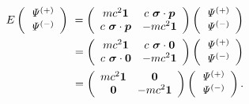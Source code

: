 \documentclass[%
 reprint,
 amsmath,amssymb,
 aps,
]{revtex4-1}
\numberwithin{equation}{section}%
\begin{document}
        
        \begin{align}
            E
            \left( 
                \begin{array}{c}
                    \it\Psi^{(+)} \\ \it\Psi^{(-)}
                \end{array}
            \right) \
            =
            \left(
                \begin{array}{cc}
                    m c^2 \bm{1} 
                        & c \ \bm{\sigma} \cdot \bm{p} \\
                    c \ \bm{\sigma} \cdot \bm{p}
                        & - m c^2 \bm{1} \end{array}
            \right)
            \left(
                \begin{array}{c}
                    \it\Psi^{(+)} \\ \it\Psi^{(-)}
                \end{array}
            \right)
            \notag
            \\
            =
            \left(
                \begin{array}{cc}
                    m c^2 \bm{1} 
                        & c \ \bm{\sigma} \cdot \bm{0} \\
                    c \ \bm{\sigma} \cdot \bm{0}
                        & - m c^2 \bm{1} \end{array}
            \right)
            \left(
                \begin{array}{c}
                    \it\Psi^{(+)} \\ \it\Psi^{(-)}
                \end{array}
            \right)
            \notag
            \\
            =
            \left(
                \begin{array}{cc}
                    m c^2 \bm{1} 
                        & \bm{0} \\
                    \bm{0}
                        & - m c^2 \bm{1} \end{array}
            \right)
            \left(
                \begin{array}{c}
                    \it\Psi^{(+)} \\ \it\Psi^{(-)}
                \end{array}
            \right)
        .
        \label{e_matrix_3}
        \end{align}
\end{document}
